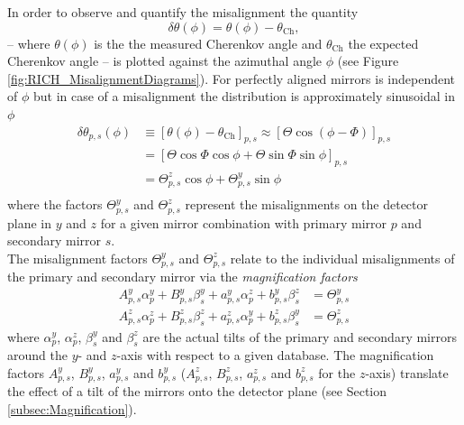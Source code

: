 In order to observe and quantify the misalignment the quantity \deltatheta 
\begin{equation}
\delta\theta\left(\phi\right) = \theta\left(\phi\right) - \theta_{\mathrm{Ch}},
\end{equation}
-- where $\theta\left(\phi\right)$ is the the measured Cherenkov angle and $\theta_{\mathrm{Ch}}$ the expected Cherenkov angle -- is plotted against the azimuthal angle $\phi$ (see Figure \ref{fig:RICH_MisalignmentDiagrams}). For perfectly aligned mirrors \deltatheta is independent of $\phi$ but in case of a misalignment the distribution is approximately sinusoidal in $\phi$
\begin{equation}
  \label{eq:DeltaTheta_ps}
  \begin{aligned}
    \delta \theta_{p,s} (\phi) & \equiv   [\theta(\phi)-\theta_{\mathrm{Ch}} ]_{p,s}
                                 \approx  [\varTheta\cos(\phi-\varPhi)       ]_{p,s} \\
                               & =        [\varTheta\cos\varPhi\cos\phi
                                 +         \varTheta\sin\varPhi\sin\phi      ]_{p,s} \\
                               & =         \varTheta^z_{p,s}\cos\phi
                                 +         \varTheta^y_{p,s}\sin\phi                 \\
  \end{aligned}
\end{equation}
where the factors $\varTheta^y_{p,s}$ and $\varTheta^z_{p,s}$ represent the misalignments on the detector plane in $y$ and $z$ for a given mirror combination with primary mirror $p$ and secondary mirror $s$.\\
The misalignment factors $\varTheta^y_{p,s}$ and $\varTheta^z_{p,s}$ relate to the individual misalignments of the primary and secondary mirror via the \textit{magnification factors}
\begin{equation}
  \label{eq:theta0_y_z}
  \begin{aligned}
      A^y_{p,s}\alpha^y_p+B^y_{p,s}\beta^y_s
    + a^y_{p,s}\alpha^z_p+b^y_{p,s}\beta^z_s & = \varTheta^y_{p,s} \\
      A^z_{p,s}\alpha^z_p+B^z_{p,s}\beta^z_s
    + a^z_{p,s}\alpha^y_p+b^z_{p,s}\beta^y_s & = \varTheta^z_{p,s}
  \end{aligned}
\end{equation}
where $\alpha^y_p$, $\alpha^z_p$, $\beta^y_s$ and $\beta^z_s$ are the actual tilts of the primary and secondary mirrors around the $y$- and $z$-axis with respect to a given database. The magnification factors $A^y_{p,s}$, $B^y_{p,s}$, $a^y_{p,s}$ and $b^y_{p,s}$ ($A^z_{p,s}$, $B^z_{p,s}$, $a^z_{p,s}$ and $b^z_{p,s}$ for the $z$-axis) translate the effect of a tilt of the mirrors onto the detector plane (see Section \ref{subsec:Magnification}).\\

